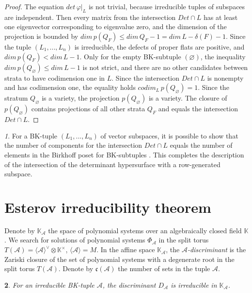 \documentclass[11pt]{article}
\theoremstyle{plain}
\newtheorem{thm}{\protect\theoremname}[section]
\theoremstyle{definition}
\theoremstyle{remark}
\newtheorem{rem}[thm]{\protect\remarkname}
\theoremstyle{plain}
\theoremstyle{plain}
\theoremstyle{plain}
\theoremstyle{definition}
\providecommand{\remarkname}{Remark}
\providecommand{\theoremname}{Theorem}
\begin{document}
\begin{proof}
The equation $det\,\varphi|_{L}$ is not trivial, because irreducible
tuples of subspaces are independent. Then every matrix from the intersection
$Det\cap L$ has at least one eigenvector corresponding to eigenvalue
zero, and the dimension of the projection is bounded by $dim\,p(Q_{F})\leq dim\,Q_{F}-1=dim\,L-\delta(F)-1.$
Since the tuple $(L_{1},...,L_{n})$ is irreducible, the defects of
proper flats are positive, and $dim\,p(Q_{F})<dim\,L-1$. Only for
the empty BK-subtuple $(\varnothing)$, the inequality $dim\,p(Q_{\varnothing})\leq dim\,L-1$
is not strict, and there are no other candidates between strata to
have codimension one in $L$. Since the intersection $Det\cap L$
is nonempty and has codimension one, the equality holds $codim_{L}\,p(Q_{\varnothing})=1$.
Since the stratum $Q_{\varnothing}$ is a variety, the projection
$p(Q_{\varnothing})$ is a variety. The closure of $p(Q_{\varnothing})$
contains projections of all other strata $Q_{F}$ and equals the intersection
$Det\cap L$.
\end{proof}
\begin{rem}
For a BK-tuple $(L_{1},...,L_{n})$ of vector subspaces, it is possible
to show that the number of components for the intersection $Det\cap L$
equals the number of elements in the Birkhoff poset for BK-subtuples
\cite{pokidkin_combinatorics_2025}. This completes the description
of the intersection of the determinant hypersurface with a row-generated
subspace.
\end{rem}


\section{\label{Section. Esterov irreducibility theorem}Esterov irreducibility
theorem}

Denote by $\mathbb{K}_{\mathscr{A}}$ the space of polynomial systems
over an algebraically closed field $\mathbb{K}$. We search for solutions
of polynomial systems $\Phi_{\mathscr{A}}$ in the split torus $T(\mathscr{A})=\langle\mathscr{A}\rangle^{\vee}\otimes\mathbb{K}^{\times}$,
$\langle\mathscr{A}\rangle=M$. In the affine space $\mathbb{K}_{\mathscr{A}}$,
the $\mathscr{A}$\textit{-discriminant} is the Zariski closure of
the set of polynomial systems with a degenerate root in the split
torus $T(\mathscr{A})$. Denote by $\mathfrak{c}(\mathscr{A})$ the
number of sets in the tuple $\mathscr{A}$.
\begin{thm}
\label{Theorem. Esterov's Conjecture}For an irreducible BK-tuple
$\mathscr{A}$, the discriminant $D_{\mathscr{A}}$ is irreducible
in $\mathbb{K}_{\mathscr{A}}$.
\end{thm}
\end{document}
